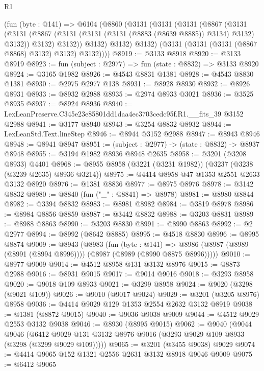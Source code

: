 \begin{lexlean}{R1}
\begin{coremodule}
      (fun (byte : @141) =>
      @6104
        (@8860
          (@3131
            (@3131
              (@3131
                (@8867
                  (@3131
                    (@3131
                      (@8867 (@3131 (@3131 (@3131 (@8883 (@8639 @8885)) @3134) @3132) @3132))
                      @3132)
                    @3132))
                @3132)
              @3132)
            @3132)
          (@3131 (@3131 (@3131 (@8867 @8868) @3132) @3132) @3132))))
@8919 := @3133 @8918
@8920 := @3133 @8919
@8923 := fun (subject : @2977) => fun (state : @8832) => @3133 @8920
@8924 := @3165 @1982
@8926 := @4543 @8831 @1381
@8928 := @4543 @8830 @1381
@8930 := @2975 @2977 @138
@8931 := @8928 @8930
@8932 := @8926 @8931
@8933 := @8932 @2988
@8935 := @2974 @8933 @3021
@8936 := @3525 @8935
@8937 := @8924 @8936
@8940 := LexLeanPreserve.C345e23e85801dd1daa4ec3703cedc95f.R1.__fits_39 @3152 @2988
@8941 := @3177 @8940
@8943 := @3254 @8832 @8932
@8944 := LexLeanStd.Text.lineStep
@8946 := @8944 @3152 @2988
@8947 := @8943 @8946
@8948 := @8941 @8947
@8951 := (subject : @2977) -> (state : @8832) -> @8937 @8948
@8955 := @3194 @1982 @8936 @8948 @2635
@8958 := @3201 (@3208 @8933) @4401
@8968 := @8955 @8958 (@3221 (@3231 @1982)) (@3237 (@3238 (@3239 @2635) @8936 @3214))
@8975 := @4414 @8958 @47 @1353 @2551 @2633 @3132 @8920
@8976 := @1381 @8836
@8977 := @8975 @8976
@8978 := @3142 @8832
@8980 := @8840 (fun ("_" : @8841) => @8978)
@8981 := @8980 @8844
@8982 := @3394 @8832
@8983 := @8981 @8982
@8984 := @3819 @8978
@8986 := @8984 @8856 @8859
@8987 := @3442 @8832
@8988 := @3203 @8831
@8989 := @8988 @8863
@8990 := @3203 @8830
@8991 := @8990 @8863
@8992 := @2 @2977
@8994 := @8992 (@8642 @8885)
@8995 := @4518 @8830
@8996 := @8995 @8874
@9009 := @8943
    (@8983
      (fun (byte : @141) =>
      @8986 (@8987 (@8989 (@8991 (@8994 @8996)))) (@8987 (@8989 (@8990 @8875 @8996)))))
@9010 := @8977 @9009
@9014 := @4512 @8958 @131 @3132 @8976
@9015 := @8873 @2988
@9016 := @8931 @9015
@9017 := @9014 @9016
@9018 := @3293 @8958
@9020 := @9018 @109 @8933
@9021 := @3299 @8958
@9024 := @9020 (@3298 (@9021 @109))
@9026 := @9010 (@9017 @9024)
@9029 := @3201 (@3205 @8976) @8958
@9036 := @4414 @9029 @129 @1353 @2554 @2632 @3132 @8919
@9038 := @1381 (@8872 @9015)
@9040 := @9036 @9038 @9009
@9044 := @4512 @9029 @2553 @3132 @9038
@9046 := @8930 (@8995 @9015)
@9062 := @9040
    (@9044
      @9046
      (@6412 @9029 @131 @3132 @8976 @9016 (@3293 @9029 @109 @8933 (@3298 (@3299 @9029 @109)))))
@9065 := @3201 (@3455 @9038) @9029
@9074 := @4414 @9065 @152 @1321 @2556 @2631 @3132 @8918 @9046 @9009
@9075 := @6412 @9065

\end{coremodule}
\end{lexlean}
